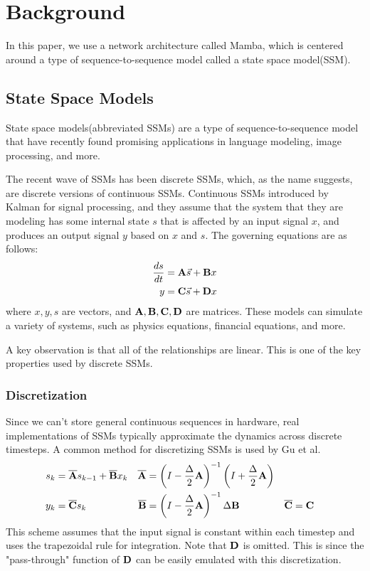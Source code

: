 
\section{Background}
In this paper, we use a network architecture called Mamba, which is centered
around a type of sequence-to-sequence model called a state space model(SSM).

\subsection{State Space Models}
State space models(abbreviated SSMs) are a type of sequence-to-sequence model
that have recently found promising applications in language
modeling\cite{mamba}, image processing\cite{medmamba}, and more\cite{s4}.

The recent wave of SSMs has been discrete SSMs, which, as the name suggests, are
discrete versions of continuous SSMs.
Continuous SSMs introduced by Kalman\cite{kalman} for signal processing, and
they assume that the system that they are modeling has some internal state $s$
that is affected by an input signal $x$, and produces an output signal $y$ based
on $x$ and $s$.
The governing equations are as follows:
$$\begin{aligned}
    \frac{ds}{dt} &= {\mathbf{A}}\vec{s} + {\mathbf{B}} x \\
    y &= {\mathbf{C}}\vec{s} + {\mathbf{D}} x
\end{aligned}$$
where $x, y, s$ are vectors, and ${\mathbf{A}}, {\mathbf{B}}, {\mathbf{C}}, {\mathbf{D}}$ are matrices.
These models can simulate a variety of systems, such as physics equations,
financial equations, and more.

A key observation is that all of the relationships are linear. This is one of
the key properties used by discrete SSMs.

\subsubsection{Discretization}
Since we can't store general continuous sequences in hardware, real
implementations of SSMs typically approximate the dynamics across discrete
timesteps.
A common method for discretizing SSMs is used by Gu et al. \cite{s4}
$$\begin{aligned}
    s_k &= \overline {{\mathbf{A}}} s_{k-1} + \overline {{\mathbf{B}}} x_k
    &
    \overline {{\mathbf{A}}} &=
    \left(I - \frac{\Delta}{2}{\mathbf{A}}\right)^{-1}
    \left(I + \frac{\Delta}{2}{\mathbf{A}}\right)
    \\
    y_k &= \overline {{\mathbf{C}}} s_k
    &
    \overline {{\mathbf{B}}} &=
    \left(I - \frac{\Delta}{2}{\mathbf{A}}\right)^{-1}
    \Delta {\mathbf{B}}
    &
    \overline {{\mathbf{C}}} &= {\mathbf{C}}
\end{aligned}$$
This scheme assumes that the input signal is constant within each timestep and
uses the trapezoidal rule for integration.
Note that ${\mathbf{D}}$ is omitted. This is since the "pass-through" function of ${\mathbf{D}}$
can be easily emulated with this discretization.

